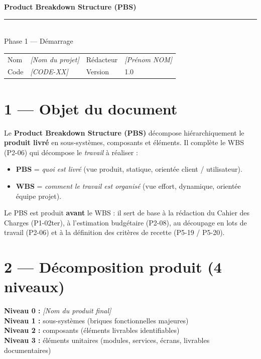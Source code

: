 \documentclass[11pt,a4paper,oneside]{report}
\begin{document}
\small

\begin{center}
{\LARGE\bfseries\color{cnNavy} Product Breakdown Structure (PBS)}\\[4pt]
\textcolor{cnOrange}{\rule{10cm}{1pt}}\\[4pt]
{\large\color{cnSlate} Phase 1 --- Démarrage}
\end{center}

\vspace{6pt}
\renewcommand{\arraystretch}{1.4}
\begin{tabularx}{\textwidth}{L{3.5cm} Y L{3.5cm} Y}
\toprule
{} & \th{} &  & \th{} \\
\midrule
Nom        & \textit{[Nom du projet]} & Rédacteur & \textit{[Prénom NOM]} \\
Code       & \textit{[CODE-XX]}       & Version   & 1.0 \\
\bottomrule
\end{tabularx}

\section*{1 --- Objet du document}

Le \textbf{Product Breakdown Structure (PBS)} décompose hiérarchiquement le \textbf{produit livré} en sous-systèmes, composants et éléments. Il complète le WBS (P2-06) qui décompose le \textit{travail} à réaliser :

\begin{itemize}
  \item \textbf{PBS} = \textit{quoi est livré} (vue produit, statique, orientée client / utilisateur).
  \item \textbf{WBS} = \textit{comment le travail est organisé} (vue effort, dynamique, orientée équipe projet).
\end{itemize}

Le PBS est produit \textbf{avant} le WBS : il sert de base à la rédaction du Cahier des Charges (P1-02ter), à l'estimation budgétaire (P2-08), au découpage en lots de travail (P2-06) et à la définition des critères de recette (P5-19 / P5-20).

\section*{2 --- Décomposition produit (4 niveaux)}

\noindent
\textbf{Niveau 0 :} \textit{[Nom du produit final]} \\
\textbf{Niveau 1 :} sous-systèmes (briques fonctionnelles majeures) \\
\textbf{Niveau 2 :} composants (éléments livrables identifiables) \\
\textbf{Niveau 3 :} éléments unitaires (modules, services, écrans, livrables documentaires)
\end{document}
